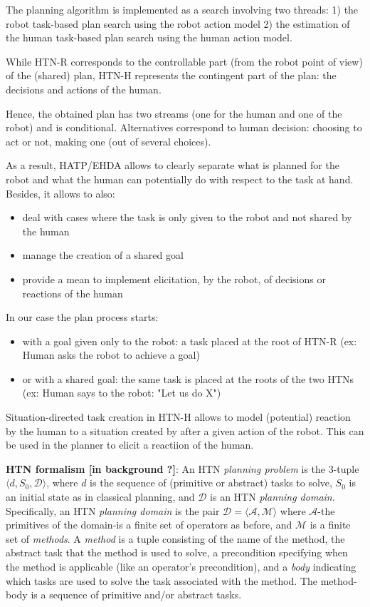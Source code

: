 \documentclass[letterpaper]{article} %
\begin{document}
The planning algorithm is implemented as a search involving two threads: 1) the robot task-based plan search using the robot action model 2) the estimation of the human task-based plan search using the human action model.

While HTN-R corresponds to the controllable part  (from the robot point of view) of the (shared) plan, HTN-H represents the contingent part of the plan: the decisions and actions of the human. 

Hence, the obtained plan has two streams (one for the human and one of the robot) and is conditional. Alternatives correspond to human decision: choosing to act or not, making one (out of several choices).

As a result, HATP/EHDA allows to clearly separate what is planned for the robot and what the human can potentially do with respect to the task at hand. Besides, it allows to also:
\begin{itemize}
    \item deal with cases where the task is only given to the robot and not shared by the human
    \item manage the creation of a shared goal
    \item provide a mean to implement elicitation, by the robot, of decisions or reactions of the human
\end{itemize}
In our case the plan process starts:
\begin{itemize}
   \item with a goal given only to the robot: a task placed at the root of HTN-R (ex: Human asks the robot to achieve a goal)
   \item or with a shared goal: the same task is placed at the roots of  the two HTNs (ex: Human says to the robot: "Let us do X")
\end{itemize}

Situation-directed task creation in HTN-H allows to model (potential) reaction by the human to a situation created by after a given action of the robot. This can be used in the planner to elicit a reactiion of the human.

\textbf{HTN formalism [in background ?]}:
An HTN \textit{planning problem} is the 3-tuple $\langle d, S_0, \mathcal{D} \rangle$, where $d$ is the sequence of (primitive or abstract) tasks to solve, $S_0$ is an initial state as in classical planning, and $\mathcal{D}$ is an HTN \textit{planning domain}. Specifically, an HTN \textit{planning domain} is the pair $\mathcal{D}=\langle\mathcal{A},\mathcal{M}\rangle$ where $\mathcal{A}$-the primitives of the domain-is a finite set of operators as before, and $\mathcal{M}$ is a finite set of \textit{methods}. A \textit{method} is a tuple consisting of the name of the method, the abstract task that the method is used to solve, a precondition specifying when the method is applicable (like an operator's precondition), and a \textit{body} indicating which tasks are used to solve the task associated with the method. The method-body is a sequence of primitive and/or abstract tasks. 
\end{document}
